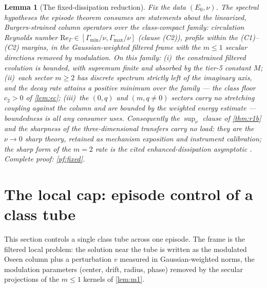 \documentclass[11pt,letterpaper]{amsart}
\newtheorem{lemma}[theorem]{Lemma}
\theoremstyle{definition}
\theoremstyle{remark}
\begin{document}
\begin{lemma}[The fixed-dissipation reduction]\label{lem:fixed}
Fix the data $(E_0,\nu)$. The spectral hypotheses the episode theorem consumes
are statements about the linearized, Burgers-strained column operators over the
\emph{class-compact} family: circulation Reynolds number
$\mathrm{Re}_\Gamma\in[\Gamma_{\min}/\nu,\Gamma_{\max}/\nu]$ (clause
\textup{(C2)}), profile within the \textup{(C1)--(C2)} margins, in the
Gaussian-weighted filtered frame with the $m\le1$ secular directions removed by
modulation. On this family: (i)~the constrained filtered evolution is bounded,
with supremum finite and absorbed by the tier-5 constant $M$; (ii)~each sector
$m\ge2$ has discrete spectrum strictly left of the imaginary axis, and the decay
rate attains a positive minimum over the family --- the class floor $c_2>0$ of
\cref{lem:ec}; (iii)~the $(0,q)$ and $(m,q\neq0)$ sectors carry no stretching
coupling against the column and are bounded by the weighted energy estimate ---
boundedness is all any consumer uses. Consequently the $\sup_\nu$ clause of
\cref{thm:r1b} and the sharpness of the three-dimensional transfers carry no
load: they are the $\nu\to0$ sharp theory, retained as mechanism exposition and
instrument calibration; the sharp form of the $m=2$ rate is the cited
enhanced-dissipation asymptotic \cite{LiWeiZhang2020,Gallay2018}. Complete
proof: \cref{pf:fixed}.
\end{lemma}

\section{The local cap: episode control of a class tube}\label{sec:jc1}

This section controls a single class tube across one episode. The frame is the
filtered local problem: the solution near the tube is written as the modulated Oseen
column plus a perturbation $v$ measured in Gaussian-weighted norms, the modulation
parameters (center, drift, radius, phase) removed by the secular projections of the
$m\le1$ kernels of \cref{lem:m1}.
\end{document}
